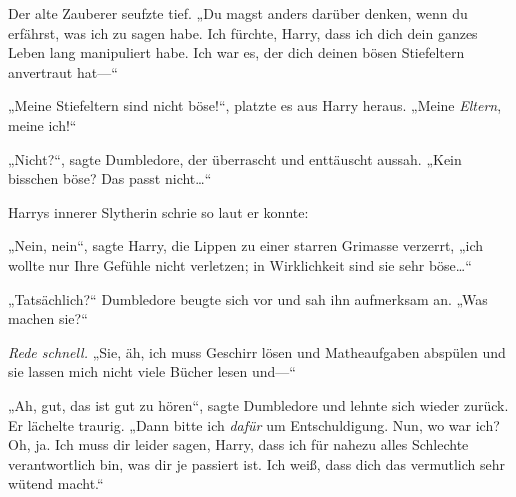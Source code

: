 Der alte Zauberer seufzte tief. „Du magst anders darüber denken, wenn du erfährst, was ich zu sagen habe. Ich fürchte, Harry, dass ich dich dein ganzes Leben lang manipuliert habe. Ich war es, der dich deinen bösen Stiefeltern anvertraut hat—“

„Meine Stiefeltern sind nicht böse!“, platzte es aus Harry heraus. „Meine \emph{Eltern}, meine ich!“

„Nicht?“, sagte Dumbledore, der überrascht und enttäuscht aussah. „Kein bisschen böse? Das passt nicht…“

Harrys innerer Slytherin schrie so laut er konnte: \emph{}

„Nein, nein“, sagte Harry, die Lippen zu einer starren Grimasse verzerrt, „ich wollte nur Ihre Gefühle nicht verletzen; in Wirklichkeit sind sie sehr böse…“

„Tatsächlich?“ Dumbledore beugte sich vor und sah ihn aufmerksam an. „Was machen sie?“

\emph{Rede schnell.} „Sie, äh, ich muss Geschirr lösen und Matheaufgaben abspülen und sie lassen mich nicht viele Bücher lesen und—“

„Ah, gut, das ist gut zu hören“, sagte Dumbledore und lehnte sich wieder zurück. Er lächelte traurig. „Dann bitte ich \emph{dafür} um Entschuldigung. Nun, wo war ich? Oh, ja. Ich muss dir leider sagen, Harry, dass ich für nahezu alles Schlechte verantwortlich bin, was dir je passiert ist. Ich weiß, dass dich das vermutlich sehr wütend macht.“

